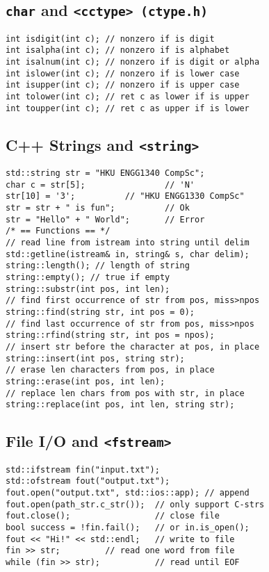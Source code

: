 \subsection*{\texttt{char} and \texttt{<cctype> (ctype.h)}}

\begin{verbatim}
int isdigit(int c); // nonzero if is digit
int isalpha(int c); // nonzero if is alphabet
int isalnum(int c); // nonzero if is digit or alpha
int islower(int c); // nonzero if is lower case
int isupper(int c); // nonzero if is upper case
int tolower(int c); // ret c as lower if is upper
int toupper(int c); // ret c as upper if is lower
\end{verbatim}
\vspace*{-1.25\baselineskip}

\subsection*{C++ Strings and \texttt{<string>}}

\begin{verbatim}
std::string str = "HKU ENGG1340 CompSc";
char c = str[5];                // 'N'
str[10] = '3';          // "HKU ENGG1330 CompSc"
str = str + " is fun";          // Ok
str = "Hello" + " World";       // Error
/* == Functions == */
// read line from istream into string until delim
std::getline(istream& in, string& s, char delim);
string::length(); // length of string
string::empty(); // true if empty
string::substr(int pos, int len);
// find first occurrence of str from pos, miss>npos
string::find(string str, int pos = 0);
// find last occurrence of str from pos, miss>npos
string::rfind(string str, int pos = npos);
// insert str before the character at pos, in place
string::insert(int pos, string str);
// erase len characters from pos, in place
string::erase(int pos, int len);
// replace len chars from pos with str, in place
string::replace(int pos, int len, string str);
\end{verbatim}
\vspace*{-1.25\baselineskip}

\subsection*{File I/O and \texttt{<fstream>}}

\begin{verbatim}
std::ifstream fin("input.txt");
std::ofstream fout("output.txt");
fout.open("output.txt", std::ios::app); // append
fout.open(path_str.c_str());  // only support C-strs
fout.close();                 // close file
bool success = !fin.fail();   // or in.is_open();
fout << "Hi!" << std::endl;   // write to file
fin >> str;         // read one word from file
while (fin >> str);           // read until EOF
\end{verbatim}

